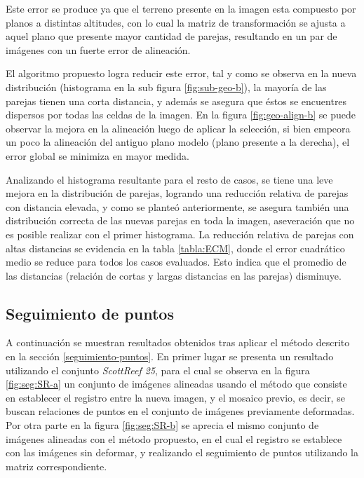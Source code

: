 Este error se produce ya que el terreno presente en la imagen esta compuesto por planos a distintas altitudes, con lo cual la matriz de transformación se ajusta a aquel plano que presente mayor cantidad de parejas, resultando en un par de imágenes con un fuerte error de alineación. 

El algoritmo propuesto logra reducir este error, tal y como se observa en la nueva distribución (histograma en la sub figura \ref{fig:sub-geo-b}), la mayoría de las parejas tienen una corta distancia, y además se asegura que éstos se encuentres dispersos por todas las celdas de la imagen. En la figura \ref{fig:geo-align-b} se puede observar la mejora en la alineación luego de aplicar la selección, si bien empeora un poco la alineación del antiguo plano modelo (plano presente a la derecha), el error global se minimiza en mayor medida. 

Analizando el histograma resultante para el resto de casos, se tiene una leve mejora en la distribución de parejas, logrando una reducción relativa de parejas con distancia elevada, y como se planteó anteriormente, se asegura también una distribución correcta de las nuevas parejas en toda la imagen, aseveración que no es posible realizar con el primer histograma. La reducción relativa de parejas con altas distancias se evidencia en la tabla \ref{tabla:ECM}, donde el error cuadrático medio se reduce para todos los casos evaluados. Esto indica que el promedio de las distancias (relación de cortas y largas distancias en las parejas) disminuye.

\subsection*{Seguimiento de puntos}

A continuación se muestran resultados obtenidos tras aplicar el método descrito en la sección \ref{seguimiento-puntos}. En primer lugar se presenta un resultado utilizando el conjunto \textit{ScottReef 25}, para el cual se observa en la figura \ref{fig:seg:SR-a} un conjunto de imágenes alineadas usando el método que consiste en establecer el registro entre la nueva imagen, y el mosaico previo, es decir, se buscan relaciones de puntos en el conjunto de imágenes previamente deformadas. Por otra parte en la figura \ref{fig:seg:SR-b} se aprecia el mismo conjunto de imágenes alineadas con el método propuesto, en el cual el registro se establece con las imágenes sin deformar, y realizando el seguimiento de puntos utilizando la matriz correspondiente.

